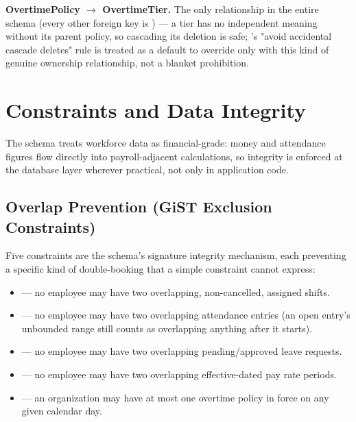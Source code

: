 \textbf{OvertimePolicy $\to$ OvertimeTier.} The only  relationship in the entire schema (every other foreign key is
) --- a tier has no independent meaning without its
parent policy, so cascading its deletion is safe; 's
"avoid accidental cascade deletes" rule is treated as a default to
override only with this kind of genuine ownership relationship, not a
blanket prohibition.

\section{Constraints and Data Integrity}

The schema treats workforce data as financial-grade: money and
attendance figures flow directly into payroll-adjacent calculations, so
integrity is enforced at the database layer wherever practical, not
only in application code.

\subsection*{Overlap Prevention (GiST Exclusion Constraints)}

Five  constraints are the schema's
signature integrity mechanism, each preventing a specific kind of
double-booking that a simple  constraint cannot express:

\begin{itemize}
  \item {} --- no employee may
        have two overlapping, non-cancelled, assigned shifts.
  \item {} --- no
        employee may have two overlapping attendance entries (an open
        entry's unbounded range still counts as overlapping anything
        after it starts).
  \item {} --- no
        employee may have two overlapping pending/approved leave
        requests.
  \item {} --- no
        employee may have two overlapping effective-dated pay rate
        periods.
  \item {} ---
        an organization may have at most one overtime policy in force
        on any given calendar day.
\end{itemize}

